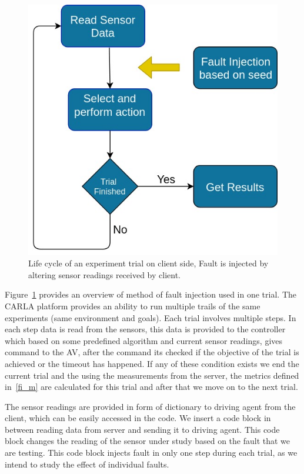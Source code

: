 \begin{figure}  
	\vspace{-0.5em}
	\centering
	\includegraphics[scale=0.3]{FI_method}
	\vspace{-0.5em}
	\caption{Life cycle of an experiment trial on client side, Fault is injected by altering sensor readings received by client.}
	\label{fig:FI_method}
	\vspace{-1.5em}
\end{figure}

Figure~\ref{fig:FI_method} provides an overview of method of fault injection used in one trial. The CARLA platform provides an ability to run multiple trails of the same experiments (same environment and goals). Each trial involves multiple steps. In each step data is read from the sensors, this data is provided to the controller which based on some predefined algorithm and current sensor readings, gives command to the AV, after the command its checked if the objective of the trial is achieved or the timeout has happened. If any of these condition exists we end the current trial and the using the measurements from the server, the metrics defined in~\ref{fi_m} are calculated for this trial and after that we move on to the next trial. 

The sensor readings are provided in form of dictionary to driving agent from the client, which can be easily accessed in the code. We insert a code block in between reading data from server and sending it to driving agent. This code block changes the reading of the sensor under study based on the fault that we are testing. This code block injects fault in only one step during each trial, as we intend to study the effect of individual faults. 

